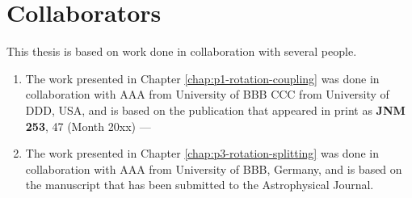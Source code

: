 \thispagestyle{plain}
\section*{Collaborators}
This thesis is based on work done in collaboration with several people.

\begin{enumerate}
    \item The work presented in Chapter \ref{chap:p1-rotation-coupling} 
    was done in collaboration with AAA from University of BBB 
		CCC from University of DDD, USA, and is based on the publication 
    that appeared in print as \textbf{JNM 253}, 47 (Month 20xx) ---
    \citep{SGK-2021-ApJS}
    
    \item The work presented in Chapter \ref{chap:p3-rotation-splitting} 
    was done in collaboration with AAA from University of BBB, Germany, 
		and is based on the manuscript that has been submitted to 
		the Astrophysical Journal.
\end{enumerate}
